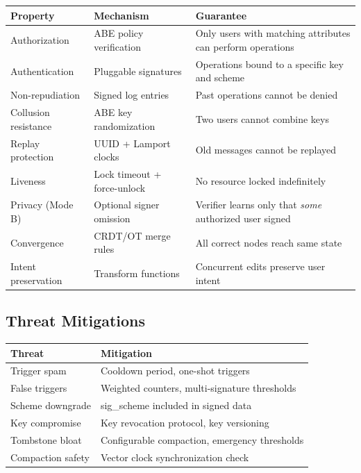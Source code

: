 \documentclass[11pt,a4paper]{article}
\begin{document}
\vspace{4pt}
\begin{tabularx}{\textwidth}{l>{\hsize=0.9\hsize}X>{\hsize=1.1\hsize}X}
\toprule
\textbf{Property} & \textbf{Mechanism} & \textbf{Guarantee} \\
\midrule
Authorization & ABE policy verification & Only users with matching attributes can perform operations \\
Authentication & Pluggable signatures & Operations bound to a specific key and scheme \\
Non-repudiation & Signed log entries & Past operations cannot be denied \\
Collusion resistance & ABE key randomization & Two users cannot combine keys \\
Replay protection & UUID + Lamport clocks & Old messages cannot be replayed \\
Liveness & Lock timeout + force-unlock & No resource locked indefinitely \\
Privacy (Mode B) & Optional signer omission & Verifier learns only that \textit{some} authorized user signed \\
Convergence & CRDT/OT merge rules & All correct nodes reach same state \\
Intent preservation & Transform functions & Concurrent edits preserve user intent \\
\bottomrule
\end{tabularx}

\subsection{Threat Mitigations}

\vspace{4pt}
\begin{tabularx}{\textwidth}{>{\hsize=0.7\hsize}X>{\hsize=1.3\hsize}X}
\toprule
\textbf{Threat} & \textbf{Mitigation} \\
\midrule
Trigger spam & Cooldown period, one-shot triggers \\
False triggers & Weighted counters, multi-signature thresholds \\
Scheme downgrade & sig\_scheme included in signed data \\
Key compromise & Key revocation protocol, key versioning \\
Tombstone bloat & Configurable compaction, emergency thresholds \\
Compaction safety & Vector clock synchronization check \\
\bottomrule
\end{tabularx}
\end{document}
